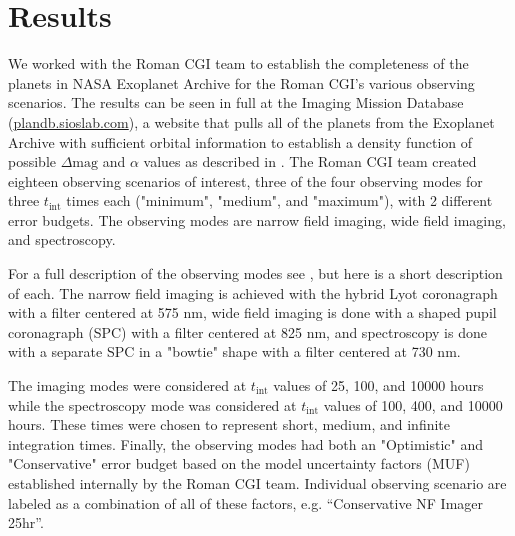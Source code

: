 \section{Results}%
\label{sec:coupling_results}

We worked with the Roman CGI team to establish the completeness of the planets
in NASA Exoplanet Archive \citep{akesonNASAExoplanet2013} for the Roman CGI's
various observing scenarios. The results can be seen in full at the Imaging Mission Database
(\url{plandb.sioslab.com}), a website that pulls all of the planets from the
Exoplanet Archive with sufficient orbital information to establish a density
function of possible $\Delta\textrm{mag}$ and $\alpha$ values as described in
\citet{savranskyExplorationDynamical2019}. The Roman CGI team created eighteen
observing scenarios of interest, three of the four observing modes for three
$t_\textrm{int}$ times each ("minimum", "medium", and "maximum"), with 2
different error budgets. The observing modes are narrow field imaging, wide
field imaging, and spectroscopy.

For a full description of the observing modes see \citet{kasdinNancyGrace2020},
but here is a short description of each. The narrow field imaging is achieved
with the hybrid Lyot coronagraph with a filter centered at 575 nm, wide field
imaging is done with a shaped pupil coronagraph (SPC) with a filter centered at
825 nm, and spectroscopy is done with a separate SPC in a "bowtie" shape with a
filter centered at 730 nm. 

The imaging modes were considered at $t_\textrm{int}$ values of 25, 100, and
10000 hours while the spectroscopy mode was considered at $t_\textrm{int}$
values of 100, 400, and 10000 hours. These times were chosen to represent
short, medium, and infinite integration times. Finally, the observing modes had
both an "Optimistic" and "Conservative" error budget based on the model
uncertainty factors (MUF) established internally by the Roman CGI team. 
Individual observing scenario are labeled as a combination of all of these factors, e.g. ``Conservative NF Imager 25hr''.

